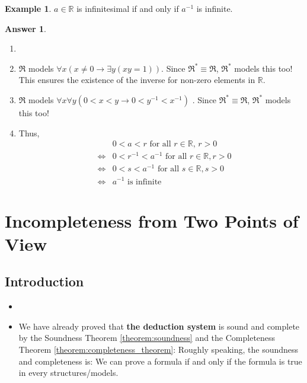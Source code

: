 \documentclass[11pt,letterpaper]{book}
\theoremstyle{definition}
\newtheorem{example}{Example}[section]
\newtheorem{answer}{Answer}[section]
\begin{document}
\begin{example}
$a \in \mathbb{R}$ is infinitesimal if and only if $a^{-1}$ is infinite.
\end{example}

\begin{answer}
\begin{enumerate}
\item[]
\item{$\mathfrak{R}$ models $ \forall x (x \neq 0 \rightarrow \exists y
(x y = 1)) $. Since $\mathfrak{R}^* \equiv \mathfrak{R}$,
$\mathfrak{R}^*$ models this too! This ensures the existence of the inverse for non-zero elements in $\mathbb{R}$.}
\item{$\mathfrak{R}$ models $ \forall x \forall y (0 < x < y
\rightarrow 0 < y^{-1} < x^{-1}  )  $ . Since $\mathfrak{R}^* \equiv
\mathfrak{R}$, $\mathfrak{R}^*$ models this too!}
\item{Thus,
\begin{eqnarray*}
& & 0 < a < r \text{ for all } r \in \mathbb{R}, \, r > 0 \\
& \iff & 0 < r^{-1} < a^{-1} \text{ for all } r \in \mathbb{R}, r > 0 \\
& \iff & 0 < s < a^{-1} \text{ for all } s \in \mathbb{R}, s > 0 \\
& \iff & a^{-1} \text{ is infinite}
\end{eqnarray*}

}
\end{enumerate}
\end{answer}



\chapter{Incompleteness from Two Points of View}

\section{Introduction}


\begin{itemize}
\item[]
\item{We have already proved that \textbf{the deduction system} is sound and complete by the Soundness Theorem \ref{theorem:soundness} and the Completeness Theorem \ref{theorem:completeness_theorem}: Roughly speaking, the soundness and completeness is: We can prove
a formula if and only if the formula is true in every structures/models.}

\end{itemize}
\end{document}
